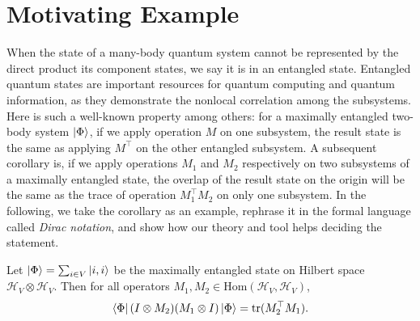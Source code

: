 
\section{Motivating Example}

When the state of a many-body quantum system cannot be represented by the direct product its component states, we say it is in an entangled state. Entangled quantum states are important resources for quantum computing and quantum information, as they demonstrate the nonlocal correlation among the subsystems. 
Here is such a well-known property among others: for a maximally entangled two-body system $\ket{\Phi}$, if we apply operation $M$ on one subsystem, the result state is the same as applying $M^\top$ on the other entangled subsystem. 
A subsequent corollary is, if we apply operations $M_1$ and $M_2$ respectively on two subsystems of a maximally entangled state, the overlap of the result state on the origin will be the same as the trace of operation $M_1^\top M_2$ on only one subsystem. In the following, we take the corollary as an example, rephrase it in the formal language called \textit{Dirac notation},
and show how our theory and tool helps deciding the statement.

\begin{example}
  Let $\ket{\Phi} = \sum_{i \in V}\ket{i, i}$ be the maximally entangled state on Hilbert space $\mathcal{H}_V\otimes\mathcal{H}_V$. Then for all operators $M_1, M_2 \in \mathrm{Hom}(\mathcal{H}_V, \mathcal{H}_V)$,
  $$
  \bra{\Phi} (I \otimes M_2) (M_1 \otimes I) \ket{\Phi} = \mathrm{tr}(M_2^\top M_1).
  $$
\end{example}

